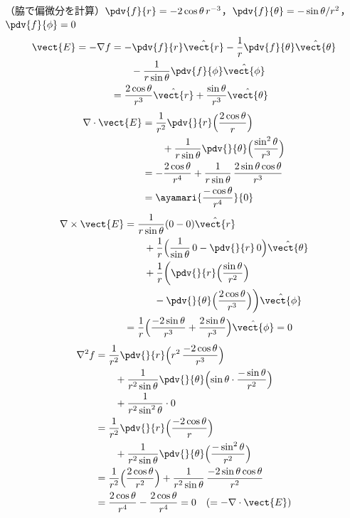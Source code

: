 （脇で偏微分を計算）$\pdv{f}{r}=-2\cos\theta\,r^{-3}$，$\pdv{f}{\theta}=-\sin\theta/r^{2}$，$\pdv{f}{\phi}=0$
\begin{align*}
\vect{E}=-\nabla f&=-\pdv{f}{r}\hat{\vect{r}}-\frac{1}{r}\pdv{f}{\theta}\hat{\vect{\theta}}\\
&\qquad-\frac{1}{r\sin\theta}\pdv{f}{\phi}\hat{\vect{\phi}}\\
&=\frac{2\cos\theta}{r^{3}}\hat{\vect{r}}+\frac{\sin\theta}{r^{3}}\hat{\vect{\theta}}
\end{align*}
\begin{align*}
\nabla\cdot\vect{E}&=\frac{1}{r^{2}}\pdv{}{r}\Bigl(\frac{2\cos\theta}{r}\Bigr)\\
&\qquad+\frac{1}{r\sin\theta}\pdv{}{\theta}\Bigl(\frac{\sin^{2}\theta}{r^{3}}\Bigr)\\
&=-\frac{2\cos\theta}{r^{4}}+\frac{1}{r\sin\theta}\,\frac{2\sin\theta\cos\theta}{r^{3}}\\
&=\ayamari{\frac{-\cos\theta}{r^{4}}}{0}
\end{align*}
\begin{align*}
\nabla\times\vect{E}&=\frac{1}{r\sin\theta}(0-0)\hat{\vect{r}}\\
&\qquad+\frac{1}{r}\Bigl(\frac{1}{\sin\theta}\,0-\pdv{}{r}\,0\Bigr)\hat{\vect{\theta}}\\
&\qquad+\frac{1}{r}\biggl(\pdv{}{r}\Bigl(\frac{\sin\theta}{r^{2}}\Bigr)\\
&\qquad\quad-\pdv{}{\theta}\Bigl(\frac{2\cos\theta}{r^{3}}\Bigr)\biggr)\hat{\vect{\phi}}\\
&=\frac{1}{r}\Bigl(\frac{-2\sin\theta}{r^{3}}+\frac{2\sin\theta}{r^{3}}\Bigr)\hat{\vect{\phi}}=0
\end{align*}
\begin{align*}
\nabla^{2}f&=\frac{1}{r^{2}}\pdv{}{r}\Bigl(r^{2}\,\frac{-2\cos\theta}{r^{3}}\Bigr)\\
&\qquad+\frac{1}{r^{2}\sin\theta}\pdv{}{\theta}\Bigl(\sin\theta\cdot\frac{-\sin\theta}{r^{2}}\Bigr)\\
&\qquad+\frac{1}{r^{2}\sin^{2}\theta}\cdot0\\
&=\frac{1}{r^{2}}\pdv{}{r}\Bigl(\frac{-2\cos\theta}{r}\Bigr)\\
&\qquad+\frac{1}{r^{2}\sin\theta}\pdv{}{\theta}\Bigl(\frac{-\sin^{2}\theta}{r^{2}}\Bigr)\\
&=\frac{1}{r^{2}}\Bigl(\frac{2\cos\theta}{r^{2}}\Bigr)+\frac{1}{r^{2}\sin\theta}\,\frac{-2\sin\theta\cos\theta}{r^{2}}\\
&=\frac{2\cos\theta}{r^{4}}-\frac{2\cos\theta}{r^{4}}=0\quad(=-\nabla\cdot\vect{E})
\end{align*}
